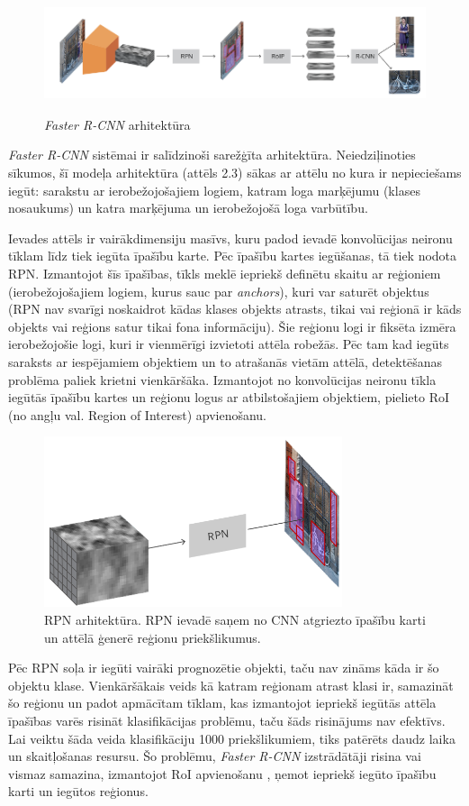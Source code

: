 \begin{figure}[h]%
	\centering
	\includegraphics[height=3.5cm]{images/fastercnnarch.png} %
	\caption{\textit{Faster R-CNN} arhitektūra \cite{fasterrcnn}}%
	\label{fig:example}%
\end{figure}
\textit{Faster R-CNN} sistēmai ir salīdzinoši sarežģīta arhitektūra. Neiedziļinoties sīkumos, šī modeļa arhitektūra (attēls 2.3) sākas ar attēlu no kura ir nepieciešams iegūt: sarakstu ar ierobežojošajiem logiem, katram loga marķējumu (klases nosaukums) un katra marķējuma un ierobežojošā loga varbūtību. 

Ievades attēls ir vairākdimensiju masīvs, kuru padod ievadē konvolūcijas neironu tīklam līdz tiek iegūta īpašību karte. Pēc īpašību kartes iegūšanas, tā tiek nodota RPN. Izmantojot šīs īpašības, tīkls meklē iepriekš definētu skaitu ar reģioniem (ierobežojošajiem logiem, kurus sauc par \textit{anchors}), kuri var saturēt objektus (RPN nav svarīgi noskaidrot kādas klases objekts atrasts, tikai vai reģionā ir kāds objekts vai reģions satur tikai fona informāciju).  Šie reģionu logi ir fiksēta izmēra ierobežojošie logi, kuri ir vienmērīgi izvietoti attēla robežās. Pēc tam kad iegūts saraksts ar iespējamiem objektiem un to atrašanās vietām attēlā, detektēšanas problēma paliek krietni vienkāršāka. Izmantojot no konvolūcijas neironu tīkla iegūtās īpašību kartes un reģionu logus ar atbilstošajiem objektiem, pielieto RoI (no angļu val. Region of Interest) apvienošanu.
\begin{figure}[h]%
	\centering
	\includegraphics[height=5cm]{images/rpnstep.png} %
	\caption{RPN arhitektūra. RPN ievadē saņem no CNN atgriezto īpašību karti un attēlā ģenerē reģionu priekšlikumus. \cite{rpnarch}}%
	\label{fig:example}%
\end{figure}
Pēc RPN soļa ir iegūti vairāki prognozētie objekti, taču nav zināms kāda ir šo objektu klase. Vienkāršākais veids kā katram reģionam atrast klasi ir, samazināt šo reģionu un padot apmācītam tīklam, kas izmantojot iepriekš iegūtās attēla īpašības varēs risināt klasifikācijas problēmu, taču šāds risinājums nav efektīvs. Lai veiktu šāda veida klasifikāciju 1000 priekšlikumiem, tiks patērēts daudz laika un skaitļošanas resursu. Šo problēmu, \textit{Faster R-CNN} izstrādātāji risina vai vismaz samazina, izmantojot RoI apvienošanu \cite{roipooling}, ņemot iepriekš iegūto īpašību karti un iegūtos reģionus. 

